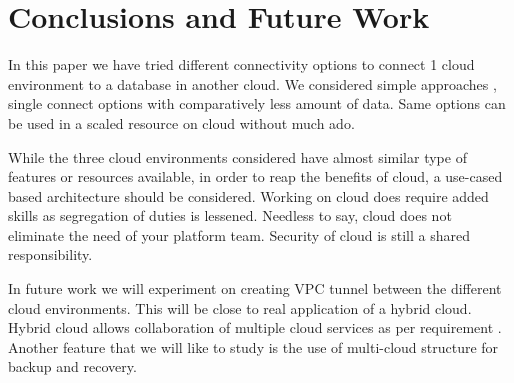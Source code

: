 \documentclass[journal]{hybrid-cloud}
\begin{document}




\section{Conclusions and Future Work}
In this paper we have tried different connectivity options to connect 1 cloud environment to a database in another cloud. We considered simple approaches , single connect options with comparatively less amount of data. Same options can be used in a scaled resource on cloud without much ado.

While the three cloud environments considered have almost similar type of features or resources available, in order to reap the benefits of cloud, a use-cased based architecture should be considered. Working on cloud does require added skills as segregation of duties is lessened. Needless to say, cloud does not eliminate the need of your platform team. Security of cloud is still a shared responsibility. 

In future work  we will experiment on creating VPC tunnel between the different cloud environments. This will be close to real application of a hybrid cloud. Hybrid cloud allows collaboration of multiple cloud services as per requirement . Another feature that we will like to study is the use of multi-cloud structure for backup and recovery.



%
\end{document}
